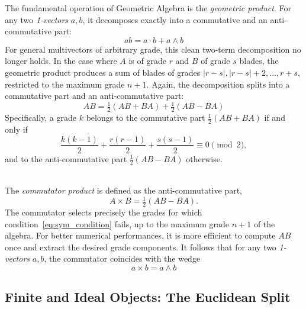 \documentclass{birkjour}
\theoremstyle{definition}
\theoremstyle{remark}
\begin{document}
The fundamental operation of Geometric Algebra is the \emph{geometric product}. For any two \emph{1-vectors} $a, b$, it decomposes exactly into a commutative and an anti-commutative part:
\begin{equation}
  ab = a \cdot b + a \wedge b
\end{equation}
For general multivectors of arbitrary grade, this clean two-term decomposition no longer holds. In the case where $A$ is of grade $r$ and $B$ of grade $s$ blades, the geometric product produces a sum of blades of grades $|r-s|, |r-s|+2, \ldots, r+s$, restricted to the maximum grade $n+1$. Again, the decomposition splits into a commutative part and an anti-commutative part:
\begin{equation}
\label{eq:gp}
  AB = \tfrac{1}{2}(AB + BA)
     + \tfrac{1}{2}(AB - BA)
\end{equation}
Specifically, a grade $k$ belongs to the commutative part $\tfrac{1}{2}(AB+BA)$ if and only if
\begin{equation}
\label{eq:sym_condition}
  \frac{k(k-1)}{2} + \frac{r(r-1)}{2} + \frac{s(s-1)}{2} \equiv 0 \pmod{2},
\end{equation}
and to the anti-commutative part $\tfrac{1}{2}(AB-BA)$ otherwise.

~\\The \emph{commutator product} is defined as the anti-commutative part,
\begin{equation}
  A \times B = \tfrac{1}{2}(AB - BA).
\end{equation}
The commutator selects precisely the grades for which condition~\eqref{eq:sym_condition}
fails, up to the maximum grade $n+1$ of the algebra. For better numerical performances, it is more efficient to compute $AB$ once and extract the desired grade components.
It follows that for any two \emph{1-vectors} $a, b$, the commutator coincides with the wedge
\begin{equation}
  a \times b = a \wedge b
\end{equation}


\subsection{Finite and Ideal Objects: The Euclidean Split}
\label{sec:split}
\end{document}
